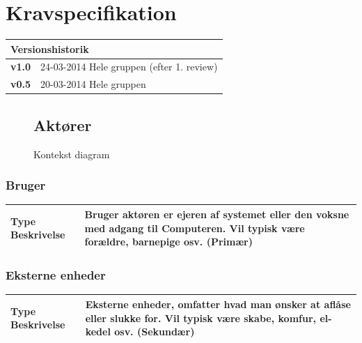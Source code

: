 \chapter{Kravspecifikation}

\begin{table}[!htbp] \centering
\begin{tabular}{|p{2cm}|p{8cm}|}
	\hline
		\multicolumn{2}{|l|}{Versionshistorik} \\\hline
		\textbf{v1.0} &24-03-2014 Hele gruppen (efter 1. review)\\\hline
		\textbf{v0.5} &20-03-2014 Hele gruppen\\\hline
	\end{tabular}
\end{table}

\begin{figure}[htbp] \centering
\section{Aktører}
\caption{Kontekst diagram}
\label{lab:kontekstdiagram}
\end{figure}

\begin{table}[!htbp] \centering
\subsection{Bruger}
\begin{tabular}{|p{4cm}|p{8cm}|}
	\hline
		\textbf{Type Beskrivelse} &
			Bruger aktøren er ejeren af systemet eller den voksne med adgang til Computeren. 
			Vil typisk være forældre, barnepige osv. (Primær) \\\hline
	\end{tabular}
\end{table}

\begin{table}[!htbp] \centering
\subsection{Eksterne enheder}
\begin{tabular}{|p{4cm}|p{8cm}|}
	\hline
		\textbf{Type Beskrivelse} &
			Eksterne enheder, omfatter hvad man ønsker at aflåse eller slukke for. 
			Vil typisk være skabe, komfur, el-kedel osv. (Sekundær) \\\hline
	\end{tabular}
\end{table}

